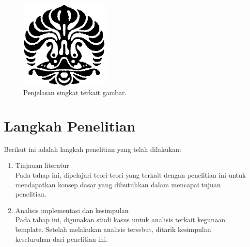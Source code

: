 \begin{figure}
	\centering
	\includegraphics[width=0.4\textwidth]{assets/pics/makara.png}
	\caption{Penjelasan singkat terkait gambar.}
	\label{fig:research_position}
\end{figure}



\section{Langkah Penelitian}
\label{sec:langkahPenelitian}
Berikut ini adalah langkah penelitian yang telah dilakukan:
\begin{enumerate}
	\item Tinjauan literatur \\
	Pada tahap ini, dipelajari teori-teori yang terkait dengan penelitian ini untuk mendapatkan konsep dasar yang dibutuhkan dalam mencapai tujuan penelitian.
	\item Analisis implementasi dan kesimpulan \\
	Pada tahap ini, digunakan studi kasus untuk analisis terkait kegunaan \f{template}.
	Setelah melakukan analisis tersebut, ditarik kesimpulan keseluruhan dari penelitian ini.
\end{enumerate}


